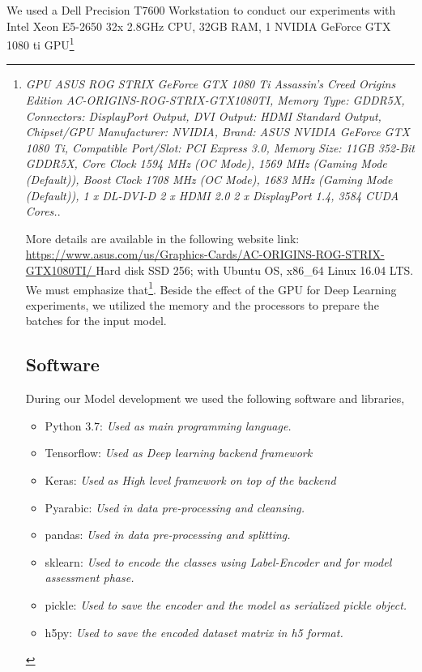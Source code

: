 We used a Dell Precision T7600 Workstation to conduct our experiments with Intel Xeon E5-2650 32x 2.8GHz CPU, 32GB RAM, 1 NVIDIA GeForce GTX 1080 ti GPU\footnote{\textit{GPU ASUS ROG STRIX GeForce GTX 1080 Ti Assassin's Creed Origins Edition AC-ORIGINS-ROG-STRIX-GTX1080TI, Memory Type: GDDR5X, Connectors: DisplayPort Output, DVI Output: HDMI Standard Output, Chipset/GPU Manufacturer: NVIDIA, Brand: ASUS NVIDIA GeForce GTX 1080 Ti, Compatible Port/Slot: PCI Express 3.0, Memory Size: 11GB 352-Bit GDDR5X, Core Clock 1594 MHz (OC Mode), 1569 MHz (Gaming Mode (Default)), Boost Clock 1708 MHz (OC Mode), 1683 MHz (Gaming Mode (Default)), 1 x DL-DVI-D 2 x HDMI 2.0 2 x DisplayPort 1.4, 3584 CUDA Cores.}.

More details are available in the following website link: \url{https://www.asus.com/us/Graphics-Cards/AC-ORIGINS-ROG-STRIX-GTX1080TI/ }
Hard disk SSD 256; with Ubuntu OS, x86\_64 Linux 16.04 LTS. We must emphasize that\footnote{we found a major impact using SSD hard disk when data reading}. Beside the effect of the GPU for Deep Learning experiments, we utilized the memory and the processors to prepare the batches for the input model.

\subsection{Software}

During our Model development we used the following software and libraries,

\begin{itemize}
 \item Python 3.7: \textit{Used as main programming language.}
 \item Tensorflow: \textit{Used as Deep learning backend framework}
 \item Keras: \textit{Used as High level framework on top of the backend}
 \item Pyarabic: \textit{Used in data pre-processing and cleansing.}
 \item pandas: \textit{Used in data pre-processing and splitting.}
 \item sklearn: \textit{Used to encode the classes using Label-Encoder and for model assessment phase.}
 \item pickle: \textit{Used to save the encoder and the model as serialized pickle object.}
 \item h5py: \textit{Used to save the encoded dataset matrix in h5 format.}
\end{itemize}

}
